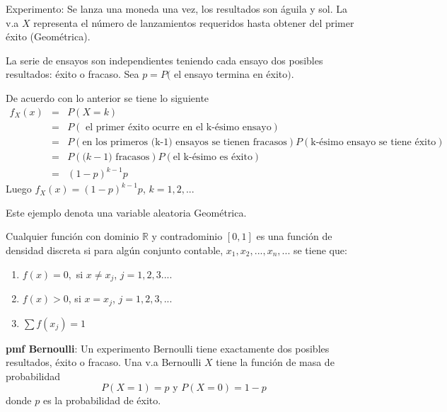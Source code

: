 \begin{example}
Experimento: Se lanza una moneda una vez, los resultados son águila y sol. La v.a  $X$ representa el número de lanzamientos requeridos hasta obtener del primer éxito (Geométrica).
\vspace{5mm}

La serie de ensayos son independientes teniendo cada ensayo dos posibles resultados: éxito o fracaso. Sea $p=P($ el ensayo termina en éxito$)$.

\vspace{5mm}
De acuerdo con lo anterior se tiene lo siguiente
\begin{eqnarray*}
f_{X}(x) &=&P(X=k) \\
&=&P(\text{ el primer éxito ocurre en el k-ésimo ensayo}) \\
&=&P(\text{en los primeros (k-1) ensayos se tienen fracasos})P(\text{k-ésimo ensayo se tiene éxito}) \\
&=&P(\text{(}k-1\text{) fracasos})P(\text{el k-ésimo es éxito}) \\
&=&(1-p)^{k-1}p
\end{eqnarray*}
Luego $f_{X}(x)=(1-p)^{k-1}p$,  $k=1,2,...$
\end{example}

\begin{remark}
Este ejemplo denota una variable aleatoria Geométrica.
\end{remark}

\begin{definition}
Cualquier función con dominio $\mathbb{R}$ y contradominio $[0,1]$ es una función de densidad discreta si para algún conjunto contable, $x_{1},x_{2},...,x_{n},...$ se tiene que:
\begin{enumerate}
\item $f(x)=0,$ si $x\neq x_{j}$, $j=1,2,3....$
\item $f(x)>0$, si $x=x_{j}$, $j=1,2,3,...$
\item $\sum f(x_{j})=1$
\end{enumerate}
\end{definition}

\vspace{5mm}
\textbf{pmf Bernoulli}: Un experimento Bernoulli tiene exactamente dos posibles resultados, éxito o fracaso. Una v.a Bernoulli $X$ tiene la función de masa de probabilidad 
\begin{equation*}
P(X=1)=p\text{ y }P(X=0)=1-p
\end{equation*}%
donde $p$ es la probabilidad de éxito.

